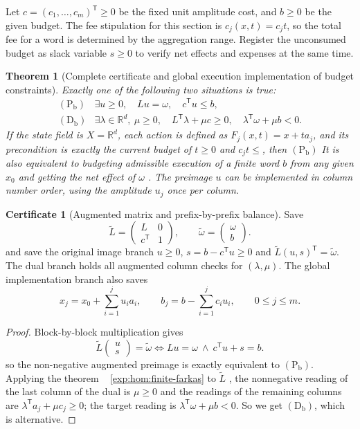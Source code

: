 \documentclass[12pt,a4paper,openany,notitlepage]{report}
\theoremstyle{plain}
\newtheorem{theorem}{Theorem}[chapter]
\theoremstyle{definition}
\newtheorem*{certificate}{Certificate}
\theoremstyle{remark}
\begin{document}
\begin{CJK*}
Let $c=(c_1,\ldots,c_m)^{\mathsf T}\ge0$ be the fixed unit amplitude cost, and $b\ge0$ be the given budget. The fee stipulation for this section is $c_j(x,t)=c_jt$, so the total fee for a word is determined by the aggregation range. Register the unconsumed budget as slack variable $s\ge0$ to verify net effects and expenses at the same time.

\begin{theorem}
[Complete certificate and global execution implementation of budget constraints]\label{exp:hom:budget-alternative}
Exactly one of the following two situations is true: \[
 \begin{array}{ll}
 \mathrm{(P_b)}&
 \exists u\ge0,\quad Lu=\omega,\quad c^{\mathsf T}u\le b,\\[2pt]
 \mathrm{(D_b)}&
 \exists\lambda\in\mathbb R^d,\ \mu\ge0,\quad
 L^{\mathsf T}\lambda+\mu c\ge0,\quad
 \lambda^{\mathsf T}\omega+\mu b<0.
 \end{array}
\] If the state field is $X=\mathbb R^d$, each action is defined as $F_j(x,t)=x+ta_j$, and its precondition is exactly the current budget of $t\ge0$ and $c_jt\le$, then $\mathrm{(P_b)}$ It is also equivalent to budgeting admissible execution of a finite word $b$ from any given $x_0$ and getting the net effect of $\omega$ . The preimage $u$ can be implemented in column number order, using the amplitude $u_j$ once per column.\end{theorem}
\begin{certificate}
[Augmented matrix and prefix-by-prefix balance]Save \[
 \widetilde L=
 \begin{pmatrix}L&0\\c^{\mathsf T}&1\end{pmatrix},
 \qquad
 \widetilde\omega=\begin{pmatrix}\omega\\b\end{pmatrix}.
\] and save the original image branch $u\ge0$, $s=b-c^{\mathsf T}u\ge0$ and $\widetilde L(u,s)^{\mathsf T}=\widetilde\omega$. The dual branch holds all augmented column checks for $(\lambda,\mu)$. The global implementation branch also saves \[
 x_j=x_0+\sum_{i=1}^{j}u_i a_i,\qquad
 b_j=b-\sum_{i=1}^{j}c_i u_i,\qquad 0\le j\le m.
\]\end{certificate}
\begin{proof}
Block-by-block multiplication gives \[
 \widetilde L\begin{pmatrix}u\\s\end{pmatrix}
 =\widetilde\omega
 \Longleftrightarrow
 Lu=\omega\ \land\ c^{\mathsf T}u+s=b.
\] so the non-negative augmented preimage is exactly equivalent to $\mathrm{(P_b)}$. Applying the theorem ~ \ref{exp:hom:finite-farkas} to $\widetilde L$ , the nonnegative reading of the last column of the dual is $\mu\ge0$ and the readings of the remaining columns are $\lambda^{\mathsf T}a_j+\mu c_j\ge0$; the target reading is $\lambda^{\mathsf T}\omega+\mu b<0$. So we get $\mathrm{(D_b)}$, which is alternative.


\end{proof}
\end{CJK*}
\end{document}

